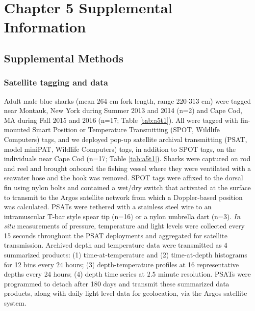 \chapter{Chapter 5 Supplemental Information}
\label{sec:app5}
\raggedbottom

\clearpage

\section{Supplemental Methods}

\subsection{Satellite tagging and data} \label{sec:a5satdata}

Adult male blue sharks (mean 264 cm fork length, range 220-313 cm) were tagged near Montauk, New York during Summer 2013 and 2014 (n=2) and Cape Cod, MA during Fall 2015 and 2016 (n=17; Table \ref{tab:a5t1}). All were tagged with fin-mounted Smart Position or Temperature Transmitting (SPOT, Wildlife Computers) tags, and we deployed pop-up satellite archival transmitting (PSAT, model miniPAT, Wildlife Computers) tags, in addition to SPOT tags, on the individuals near Cape Cod (n=17; Table \ref{tab:a5t1}). Sharks were captured on rod and reel and brought onboard the fishing vessel where they were ventilated with a seawater hose and the hook was removed. SPOT tags were affixed to the dorsal fin using nylon bolts and contained a wet/dry switch that activated at the surface to transmit to the Argos satellite network from which a Doppler-based position was calculated. PSATs were tethered with a stainless steel wire to an intramuscular T-bar style spear tip (n=16) or a nylon umbrella dart (n=3). \textit{In situ} measurements of pressure, temperature and light levels were collected every 15 seconds throughout the PSAT deployments and aggregated for satellite transmission. Archived depth and temperature data were transmitted as 4 summarized products: (1) time-at-temperature and (2) time-at-depth histograms for 12 bins every 24 hours; (3) depth-temperature profiles at 16 representative depths every 24 hours; (4) depth time series at 2.5 minute resolution. PSATs were programmed to detach after 180 days and transmit these summarized data products, along with daily light level data for geolocation, via the Argos satellite system.

